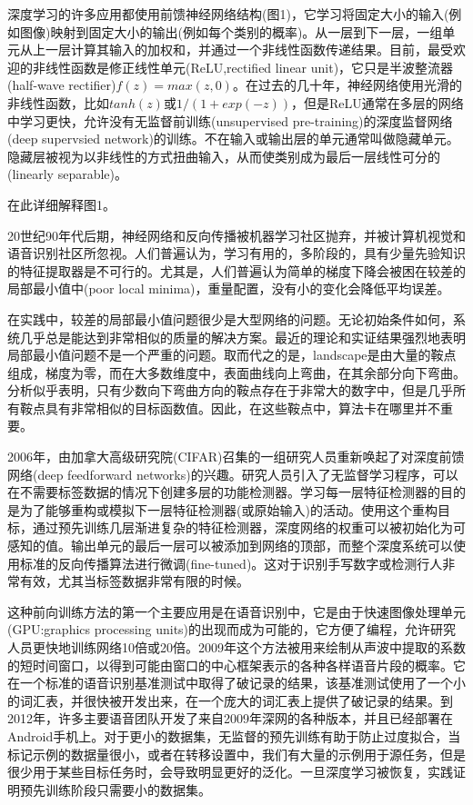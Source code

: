 深度学习的许多应用都使用前馈神经网络结构(图1)，它学习将固定大小的输入(例如图像)映射到固定大小的输出(例如每个类别的概率)。从一层到下一层，一组单元从上一层计算其输入的加权和，并通过一个非线性函数传递结果。目前，最受欢迎的非线性函数是修正线性单元(ReLU,rectified linear unit)，它只是半波整流器(half-wave rectifier)$f(z)=max(z,0)$。在过去的几十年，神经网络使用光滑的非线性函数，比如$tanh(z)$或$1\slash(1+exp(-z))$，但是ReLU通常在多层的网络中学习更快，允许没有无监督前训练(unsupervised pre-training)的深度监督网络(deep supervsied network)的训练。不在输入或输出层的单元通常叫做隐藏单元。隐藏层被视为以非线性的方式扭曲输入，从而使类别成为最后一层线性可分的(linearly separable)。

在此详细解释图1。

20世纪90年代后期，神经网络和反向传播被机器学习社区抛弃，并被计算机视觉和语音识别社区所忽视。人们普遍认为，学习有用的，多阶段的，具有少量先验知识的特征提取器是不可行的。尤其是，人们普遍认为简单的梯度下降会被困在较差的局部最小值中(poor local minima)，重量配置，没有小的变化会降低平均误差。

在实践中，较差的局部最小值问题很少是大型网络的问题。无论初始条件如何，系统几乎总是能达到非常相似的质量的解决方案。最近的理论和实证结果强烈地表明局部最小值问题不是一个严重的问题。取而代之的是，landscape是由大量的鞍点组成，梯度为零，而在大多数维度中，表面曲线向上弯曲，在其余部分向下弯曲。分析似乎表明，只有少数向下弯曲方向的鞍点存在于非常大的数字中，但是几乎所有鞍点具有非常相似的目标函数值。因此，在这些鞍点中，算法卡在哪里并不重要。

2006年，由加拿大高级研究院(CIFAR)召集的一组研究人员重新唤起了对深度前馈网络(deep feedforward networks)的兴趣。研究人员引入了无监督学习程序，可以在不需要标签数据的情况下创建多层的功能检测器。学习每一层特征检测器的目的是为了能够重构或模拟下一层特征检测器(或原始输入)的活动。使用这个重构目标，通过预先训练几层渐进复杂的特征检测器，深度网络的权重可以被初始化为可感知的值。输出单元的最后一层可以被添加到网络的顶部，而整个深度系统可以使用标准的反向传播算法进行微调(fine-tuned)。这对于识别手写数字或检测行人非常有效，尤其当标签数据非常有限的时候。

这种前向训练方法的第一个主要应用是在语音识别中，它是由于快速图像处理单元(GPU:graphics processing units)的出现而成为可能的，它方便了编程，允许研究人员更快地训练网络10倍或20倍。2009年这个方法被用来绘制从声波中提取的系数的短时间窗口，以得到可能由窗口的中心框架表示的各种各样语音片段的概率。它在一个标准的语音识别基准测试中取得了破记录的结果，该基准测试使用了一个小的词汇表，并很快被开发出来，在一个庞大的词汇表上提供了破记录的结果。到2012年，许多主要语音团队开发了来自2009年深网的各种版本，并且已经部署在Android手机上。对于更小的数据集，无监督的预先训练有助于防止过度拟合，当标记示例的数据量很小，或者在转移设置中，我们有大量的示例用于源任务，但是很少用于某些目标任务时，会导致明显更好的泛化。一旦深度学习被恢复，实践证明预先训练阶段只需要小的数据集。

